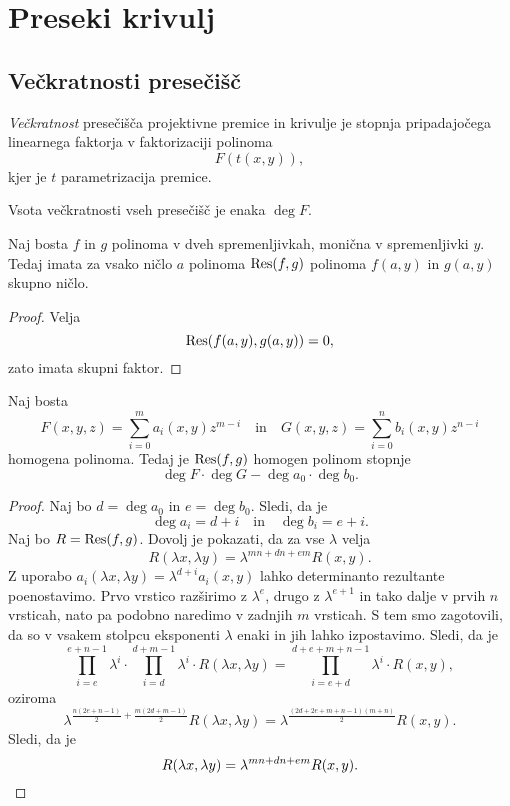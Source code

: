 \section{Preseki krivulj}

\subsection{Večkratnosti presečišč}


\begin{definicija}
\emph{Večkratnost} presečišča
projektivne premice in krivulje je stopnja pripadajočega linearnega
faktorja v faktorizaciji polinoma
\[
F(t(x,y)),
\]
kjer je $t$ parametrizacija premice.
\end{definicija}

\begin{opomba}
Vsota večkratnosti vseh presečišč je enaka $\deg F$.
\end{opomba}

\begin{trditev}
Naj bosta $f$ in $g$ polinoma v dveh spremenljivkah, monična v
spremenljivki $y$. Tedaj imata za vsako ničlo $a$ polinoma
$\operatorname{Res}(f,g)$ polinoma $f(a, y)$ in $g(a, y)$ skupno ničlo.
\end{trditev}

\begin{proof}
Velja
\[
\operatorname{Res}(f(a, y), g(a, y)) = 0,
\]
zato imata skupni faktor.
\end{proof}

\begin{trditev}
Naj bosta
\[
F(x, y, z) = \sum_{i=0}^m a_i(x,y) z^{m-i}
\quad \text{in} \quad
G(x, y, z) = \sum_{i=0}^n b_i(x,y) z^{n-i}
\]
homogena polinoma. Tedaj je $\operatorname{Res}(f,g)$ homogen polinom stopnje
\[
\deg F \cdot \deg G - \deg a_0 \cdot \deg b_0.
\]
\end{trditev}

\begin{proof}
Naj bo $d = \deg a_0$ in $e = \deg b_0$. Sledi, da je
\[
\deg a_i = d + i
\quad \text{in} \quad
\deg b_i = e + i.
\]
Naj bo $R = \operatorname{Res}(f, g)$. Dovolj je pokazati, da za vse $\lambda$
velja
\[
R(\lambda x, \lambda y) = \lambda^{mn + dn + em} R(x, y).
\]
Z uporabo $a_i(\lambda x, \lambda y) = \lambda^{d + i} a_i(x, y)$
lahko determinanto rezultante poenostavimo. Prvo vrstico razširimo
z $\lambda^e$, drugo z $\lambda^{e+1}$ in tako dalje v prvih $n$
vrsticah, nato pa podobno naredimo v zadnjih $m$ vrsticah. S tem
smo zagotovili, da so v vsakem stolpcu eksponenti $\lambda$ enaki
in jih lahko izpostavimo. Sledi, da je
\[
\prod_{i=e}^{e+n-1} \lambda^i \cdot
\prod_{i=d}^{d+m-1} \lambda^i \cdot
R(\lambda x, \lambda y) =
\prod_{i=e+d}^{d+e+m+n-1} \lambda^i \cdot R(x, y),
\]
oziroma
\[
\lambda^{\frac{n (2e + n - 1)}{2} + \frac{m(2d + m - 1)}{2}}
R(\lambda x, \lambda y) =
\lambda^{\frac{(2d + 2e + m + n - 1)(m + n)}{2}} R(x, y).
\]
Sledi, da je
\[
R(\lambda x, \lambda y) = \lambda^{mn + dn + em} R(x, y). \qedhere
\]
\end{proof}

